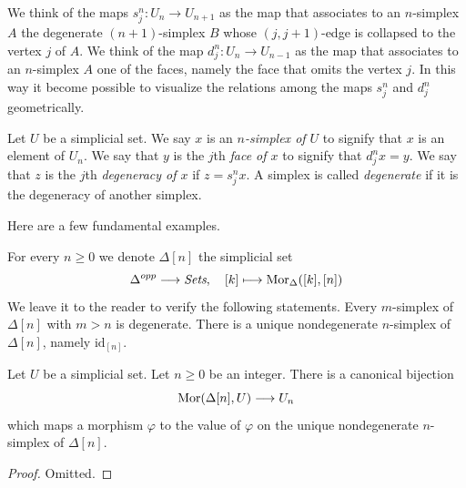 \medskip\noindent
We think of the maps $s^n_j : U_n \to U_{n + 1}$ as
the map that associates to an $n$-simplex $A$ the degenerate
$(n + 1)$-simplex $B$ whose $(j, j + 1)$-edge is collapsed
to the vertex $j$ of $A$. We think of the map $d^n_j : U_n \to U_{n - 1}$
as the map that associates to an $n$-simplex $A$ one of the
faces, namely the face that omits the vertex $j$.
In this way it become possible to visualize the relations
among the maps $s^n_j$ and $d^n_j$ geometrically.

\begin{definition}
\label{definition-terminology-simplicial-sets}
Let $U$ be a simplicial set.
We say $x$ is an {\it $n$-simplex of $U$} to signify that
$x$ is an element of $U_n$. We say that $y$ is the $j$th
{\it face of $x$} to signify that $d^n_jx = y$. We say that
$z$ is the $j$th {\it degeneracy of $x$} if $z = s^n_jx$.
A simplex is called {\it degenerate} if it is the degeneracy
of another simplex.
\end{definition}

\noindent
Here are a few fundamental examples.

\begin{example}
\label{example-simplex-simplicial-set}
For every $n \geq 0$ we denote $\Delta[n]$ the simplicial set
$$
\Delta^{opp} \longrightarrow \textit{Sets},\quad
[k] \longmapsto \mathop{\mathrm{Mor}}\nolimits_{\Delta}([k], [n])
$$
We leave it to the reader to verify the following statements.
Every $m$-simplex of $\Delta[n]$ with $m > n$ is degenerate.
There is a unique nondegenerate $n$-simplex of $\Delta[n]$,
namely $\text{id}_{[n]}$.
\end{example}

\begin{lemma}
\label{lemma-simplex-map}
Let $U$ be a simplicial set. Let $n \geq 0$ be an integer.
There is a canonical bijection
$$
\mathop{\mathrm{Mor}}\nolimits(\Delta[n], U)
\longrightarrow
U_n
$$
which maps a morphism $\varphi$ to the value of $\varphi$
on the unique nondegenerate $n$-simplex of $\Delta[n]$.
\end{lemma}

\begin{proof}
Omitted.
\end{proof}

